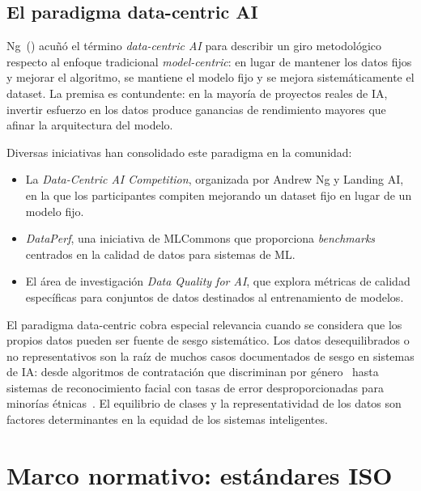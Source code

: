 \subsection{El paradigma data-centric AI}

Ng~(\citeyear{ng2021datacentric}) acuñó el término \emph{data-centric AI}
para describir un giro metodológico respecto al enfoque tradicional
\emph{model-centric}: en lugar de mantener los datos fijos y mejorar el
algoritmo, se mantiene el modelo fijo y se mejora sistemáticamente el dataset.
La premisa es contundente: en la mayoría de proyectos reales de \ac{IA},
invertir esfuerzo en los datos produce ganancias de rendimiento mayores que
afinar la arquitectura del modelo.

Diversas iniciativas han consolidado este paradigma en la comunidad:

\begin{itemize}
  \item La \emph{Data-Centric AI Competition}, organizada por Andrew Ng y
    Landing AI, en la que los participantes compiten mejorando un dataset fijo
    en lugar de un modelo fijo.
  \item \emph{DataPerf}, una iniciativa de MLCommons que proporciona
    \emph{benchmarks} centrados en la calidad de datos para sistemas de
    \ac{ML}.
  \item El área de investigación \emph{Data Quality for AI}, que explora
    métricas de calidad específicas para conjuntos de datos destinados al
    entrenamiento de modelos.
\end{itemize}

El paradigma data-centric cobra especial relevancia cuando se considera que
los propios datos pueden ser fuente de sesgo sistemático. Los datos
desequilibrados o no representativos son la raíz de muchos casos documentados
de sesgo en sistemas de \ac{IA}: desde algoritmos de contratación que discriminan por
género~\citep{amazon2018} hasta sistemas de reconocimiento facial con tasas de
error desproporcionadas para minorías étnicas~\citep{buolamwini2018}. El equilibrio de clases y la representatividad de los datos son factores
determinantes en la equidad de los sistemas inteligentes.


\section{Marco normativo: estándares ISO}
\label{sec:marco-normativo}

